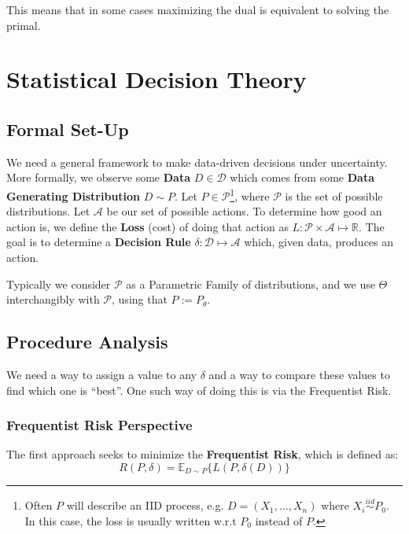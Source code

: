 \documentclass[]{article}
\theoremstyle{mattstyle}
\theoremstyle{definition}
\begin{document}
This means that in some cases maximizing the dual is equivalent to solving the primal.

\newpage

\section{Statistical Decision Theory}

\subsection{Formal Set-Up}

We need a general framework to make data-driven decisions under uncertainty. More formally, we observe some \textbf{Data} \(D \in \mathcal{D}\) which comes from some \textbf{Data Generating Distribution} \(D \sim P\). Let \(P\in \mathcal{P}\)\footnote{Often $P$ will describe an IID process, e.g. $D = (X_1,...,X_n)$ where $X_i \overset{iid}\sim P_0$. In this case, the loss is usually written w.r.t $P_0$ instead of $P$.}, where \(\mathcal{P}\) is the set of possible distributions. Let \(\mathcal{A}\) be our set of possible actions. To determine how good an action is, we define the \textbf{Loss} (cost) of doing that action as \(L: \mathcal{P} \times \mathcal{A} \mapsto \mathbb{R}\). The goal is to determine a \textbf{Decision Rule} \(\delta: \mathcal{D} \mapsto \mathcal{A}\) which, given data, produces an action.

Typically we consider \(\mathcal{P}\) as a Parametric Family of distributions, and we use \(\Theta\) interchangibly with \(\mathcal{P}\), using that \(P := P_{\theta}\).

\subsection{Procedure Analysis}

We need a way to assign a value to any \(\delta\) and a way to compare these values to find which one is ``best''. One such way of doing this is via the Frequentist Risk.

\subsubsection{Frequentist Risk Perspective} 
The first approach seeks to minimize the \textbf{Frequentist Risk}, which is defined as:
\begin{equation}\label{eq:1}
	R(P,\delta)=\mathbb{E}_{D\sim P}\{L(P,\delta(D))\}
\end{equation}
\end{document}
